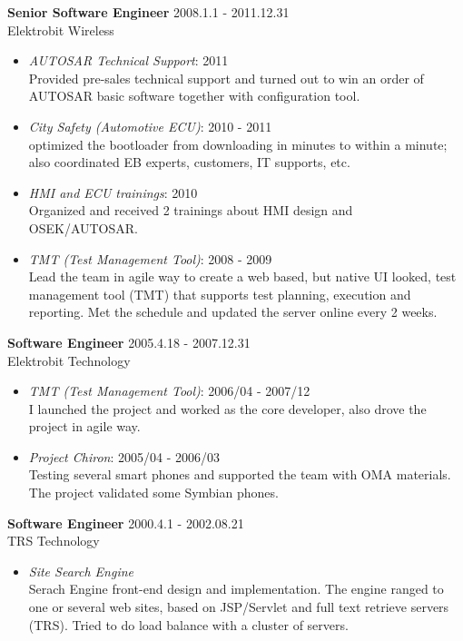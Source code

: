\textbf{Senior Software Engineer} \hfill 2008.1.1 - 2011.12.31 \\
        Elektrobit Wireless
        \begin{itemize}  \itemsep -2pt %
            \item {\em AUTOSAR Technical Support}: 2011 \\
                    Provided pre-sales technical support
                    and turned out to win an order of AUTOSAR basic software together with configuration tool.
            \item {\em City Safety (Automotive ECU)}: 2010 - 2011 \\
                    optimized the bootloader from downloading in minutes to within a minute;
                    also coordinated EB experts, customers, IT supports, etc.
            \item {\em HMI and ECU trainings}: 2010\\
                Organized and received 2 trainings about HMI design and OSEK/AUTOSAR.
            \item {\em TMT (Test Management Tool)}: 2008 - 2009 \\
                    Lead the team in agile way
                    to create a web based, but native UI looked, test management tool (TMT)
                    that supports test planning, execution and reporting.
                    Met the schedule and updated the server online every 2 weeks.
        \end{itemize}
 
\textbf{Software Engineer} \hfill 2005.4.18 - 2007.12.31 \\
        Elektrobit Technology
        \begin{itemize}  \itemsep -2pt %
            \item {\em TMT (Test Management Tool)}: 2006/04 - 2007/12 \\ 
            I launched the project and worked as the core developer, also drove
            the project in agile way.
            \item {\em Project Chiron}: 2005/04 - 2006/03 \\
                Testing several smart phones and supported the team with OMA materials.
                The project validated some Symbian phones.
        \end{itemize}
 
\textbf{Software Engineer} \hfill 2000.4.1 - 2002.08.21 \\
        TRS Technology
        \begin{itemize}  \itemsep -2pt %
            \item {\em Site Search Engine} \\ 
                Serach Engine front-end design and implementation.
                The engine ranged to one or several web sites, based on JSP/Servlet and full text retrieve servers (TRS).
                Tried to do load balance with a cluster of servers.
        \end{itemize}
